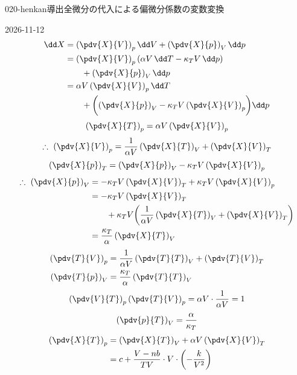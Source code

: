 \documentclass[uplatex,dvipdfmx,a4paper,11pt]{jsarticle}
\begin{document}
\begin{mondai}{020-henkan}{導出}{全微分の代入による偏微分係数の変数変換}
\begin{kotaeutsushi}{2026-11-12}
\begin{align*}
\dd X&=\left(\pdv{X}{V}\right)_{p}\dd V+\left(\pdv{X}{p}\right)_{V}\dd p\\
&=\left(\pdv{X}{V}\right)_{p}(\alpha V\,\dd T-\kappa_{T}V\,\dd p)\\
&\qquad+\left(\pdv{X}{p}\right)_{V}\dd p\\
&=\alpha V\left(\pdv{X}{V}\right)_{p}\dd T\\
&\qquad+\biggl(\left(\pdv{X}{p}\right)_{V}-\kappa_{T}V\left(\pdv{X}{V}\right)_{p}\biggr)\dd p
\end{align*}
\[ \left(\pdv{X}{T}\right)_{p}=\alpha V\left(\pdv{X}{V}\right)_{p} \]
\[ \therefore\ \left(\pdv{X}{V}\right)_{p}=\frac{1}{\alpha V}\left(\pdv{X}{T}\right)_{V}+\left(\pdv{X}{V}\right)_{T} \]
\[ \left(\pdv{X}{p}\right)_{T}=\left(\pdv{X}{p}\right)_{V}-\kappa_{T}V\left(\pdv{X}{V}\right)_{p} \]
\begin{align*}
\therefore\ \left(\pdv{X}{p}\right)_{V}&=-\kappa_{T}V\left(\pdv{X}{V}\right)_{T}+\kappa_{T}V\left(\pdv{X}{V}\right)_{p}\\
&=-\kappa_{T}V\left(\pdv{X}{V}\right)_{T}\\
&\qquad+\kappa_{T}V\biggl(\frac{1}{\alpha V}\left(\pdv{X}{T}\right)_{V}+\left(\pdv{X}{V}\right)_{T}\biggr)\\
&=\frac{\kappa_{T}}{\alpha}\left(\pdv{X}{T}\right)_{V}
\end{align*}
\begin{align*}
\left(\pdv{T}{V}\right)_{p}&=\frac{1}{\alpha V}\left(\pdv{T}{T}\right)_{V}+\left(\pdv{T}{V}\right)_{T}\\
\left(\pdv{T}{p}\right)_{V}&=\frac{\kappa_{T}}{\alpha}\left(\pdv{T}{T}\right)_{V}
\end{align*}
\[ \left(\pdv{V}{T}\right)_{p}\left(\pdv{T}{V}\right)_{p}=\alpha V\cdot\frac{1}{\alpha V}=1 \]
\[ \left(\pdv{p}{T}\right)_{V}=\frac{\alpha}{\kappa_{T}} \]
\begin{align*}
\left(\pdv{X}{T}\right)_{p}&=\left(\pdv{X}{T}\right)_{V}+\alpha V\left(\pdv{X}{V}\right)_{T}\\
&=c+\frac{V-nb}{TV}\cdot V\cdot\left(-\frac{k}{V^{2}}\right)\\

\end{align*}
\end{kotaeutsushi}
\end{mondai}
\end{document}
